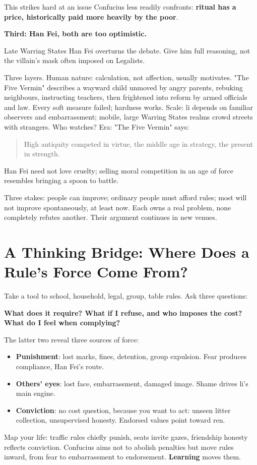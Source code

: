This strikes hard at an issue Confucius less readily confronts: \textbf{ritual has a price, historically paid more heavily by the poor}.

\textbf{Third: Han Fei, both are too optimistic.}

Late Warring States Han Fei overturns the debate. Give him full reasoning, not the villain's mask often imposed on Legalists.

Three layers. Human nature: calculation, not affection, usually motivates. "The Five Vermin" describes a wayward child unmoved by angry parents, rebuking neighbours, instructing teachers, then frightened into reform by armed officials and law. Every soft measure failed; hardness works. Scale: li depends on familiar observers and embarrassment; mobile, large Warring States realms crowd streets with strangers. Who watches? Era: "The Five Vermin" says:

\begin{quote}
High antiquity competed in virtue, the middle age in strategy, the present in strength.
\end{quote}
Han Fei need not love cruelty; selling moral competition in an age of force resembles bringing a spoon to battle.

Three stakes: people can improve; ordinary people must afford rules; most will not improve spontaneously, at least now. Each owns a real problem, none completely refutes another. Their argument continues in new venues.

\section[Thinking Bridge: A Rule's Power]{A Thinking Bridge: Where Does a Rule's Force Come From?}
Take a tool to school, household, legal, group, table rules. Ask three questions:

\textbf{What does it require? What if I refuse, and who imposes the cost? What do I feel when complying?}

The latter two reveal three sources of force:

\begin{itemize}
\item \textbf{Punishment}: lost marks, fines, detention, group expulsion. Fear produces compliance, Han Fei's route.
\item \textbf{Others' eyes}: lost face, embarrassment, damaged image. Shame drives li's main engine.
\item \textbf{Conviction}: no cost question, because you want to act: unseen litter collection, unsupervised honesty. Endorsed values point toward ren.
\end{itemize}
Map your life: traffic rules chiefly punish, seats invite gazes, friendship honesty reflects conviction. Confucius aims not to abolish penalties but move rules inward, from fear to embarrassment to endorsement. \textbf{Learning} moves them.

